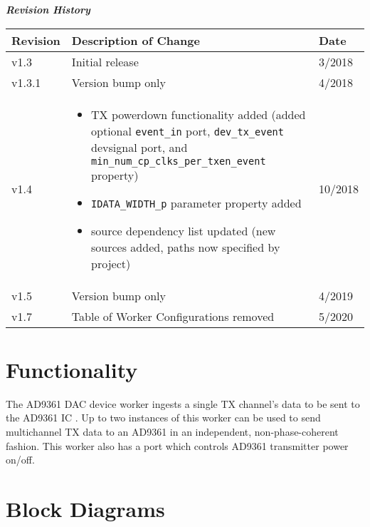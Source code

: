 \documentclass{article}
\def\Comp{AD9361 DAC}
\begin{document}
	\begin{center}
	\textit{\textbf{Revision History}}
		\begin{table}[H]
		\label{table:revisions} %
      \begin{longtable}{|p{}
                        |p{}
                        |p{}|}
			\hline
			\rowcolor{blue}
			\textbf{Revision} & \textbf{Description of Change} & \textbf{Date} \\
		    \hline
		    v1.3 & Initial release & 3/2018 \\
		    \hline
		    v1.3.1 & Version bump only & 4/2018 \\
		    \hline
        v1.4 &
          \begin{itemize}
            \item TX powerdown functionality added (added optional \verb+event_in+ port, \verb+dev_tx_event+ devsignal port, and \verb+min_num_cp_clks_per_txen_event+ property)
            \item \verb+IDATA_WIDTH_p+ parameter property added
            \item source dependency list updated (new sources added, paths now specified by project)
          \end{itemize} & 10/2018 \\
		    \hline
		    v1.5 & Version bump only & 4/2019 \\
		    \hline
		    v1.7 & Table of Worker Configurations removed & 5/2020 \\
			\hline
			\end{longtable}
		\end{table}
	\end{center}

\section*{Functionality}
	The \Comp{} device worker ingests a single TX channel's data to be sent to the AD9361 IC \cite{ad9361}. Up to two instances of this worker can be used to send multichannel TX data to an AD9361 in an independent, non-phase-coherent fashion. This worker also has a port which controls AD9361 transmitter power on/off.
\section*{Block Diagrams}
\end{document}
